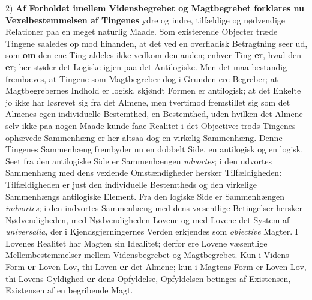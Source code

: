 \documentclass[11pt]{book}
\newcommand{\opage}[1]{\marginnote{\footnotesize\textit{[#1]}}}
\begin{document}
2) \textbf{Af Forholdet imellem Vidensbegrebet og Magtbegrebet forklares
nu Vexelbestemmelsen af Tingenes} ydre og indre, tilfældige og
nødvendige Relationer paa en meget naturlig Maade. Som existerende
Objecter træde Tingene saaledes op
\opage{205} \setcounter{footnote}{0}%
mod hinanden, at det ved en overfladisk Betragtning seer ud, som
\textbf{om} den ene Ting aldeles ikke vedkom den anden; enhver Ting
\textbf{er}, hvad den \textbf{er}; her støder det Logiske igjen paa det
Antilogiske. Men det maa bestandig fremhæves, at Tingene som
Magtbegreber dog i Grunden ere Begreber; at Magtbegrebernes Indhold er
logisk, skjøndt Formen er antilogisk; at det Enkelte jo ikke har
løsrevet sig fra det Almene, men tvertimod fremstillet sig som det
Almenes egen individuelle Bestemthed, en Bestemthed, uden hvilken det
Almene selv ikke paa nogen Maade kunde faae Realitet i det Objective:
trods Tingenes ophævede Sammenhæng er her altsaa dog en virkelig
Sammenhæng. Denne Tingenes Sammenhæng frembyder nu en dobbelt Side, en
antilogisk og en logisk. Seet fra den antilogiske Side er Sammenhængen
\emph{udvortes}; i den udvortes Sammenhæng med dens vexlende
Omstændigheder hersker Tilfældigheden: Tilfældigheden er just den
individuelle Bestemtheds og den virkelige Sammenhængs antilogiske
Element. Fra den logiske Side er Sammenhængen \emph{indvortes}; i den
indvortes Sammenhæng med dens væsentlige Betingelser hersker
Nødvendigheden, med Nødvendigheden Lovene og med Lovene det System af
\textit{universalia}, der i Kjendsgjerningernes Verden erkjendes som
\textit{objective} Magter. I Lovenes Realitet har Magten sin Idealitet;
derfor ere Lovene væsentlige Mellembestemmelser mellem Vidensbegrebet
og Magtbegrebet. Kun i Videns Form \textbf{er} Loven Lov, thi Loven
\textbf{er} det Almene; kun i Magtens Form er Loven Lov, thi Lovens
Gyldighed \textbf{er} dens Opfyldelse, Opfyldelsen betinges af
Existensen, Existensen af en begribende Magt.
\end{document}
